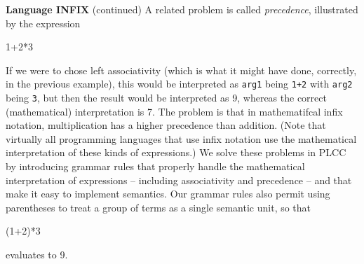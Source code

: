 \begin{minipage}[t]{\sw}
\slidenumber
\LARGE
{\bf Language INFIX} (continued)\exx
A related problem is called {\em precedence},
illustrated by the expression
\begin{qv}
1+2*3
\end{qv}
If we were to chose left associativity
(which is what it might have done, correctly, in the previous example),
this would be interpreted as \verb'arg1' being \verb'1+2'
with \verb'arg2' being \verb'3',
but then the result would be interpreted as 9,
whereas the correct (mathematical) interpretation is 7.
The problem is that in mathematifcal infix notation,
multiplication has a higher precedence than addition.
(Note that virtually all programming languages that use infix notation
use the mathematical interpretation of these kinds of expressions.)\exx
We solve these problems in PLCC by introducing grammar rules
that properly handle the mathematical interpretation
of expressions -- including associativity and precedence --
and that make it easy to implement semantics.
Our grammar rules also permit using parentheses
to treat a group of terms as a single semantic unit,
so that
\begin{qv}
(1+2)*3
\end{qv}
evaluates to 9.
\end{minipage}
